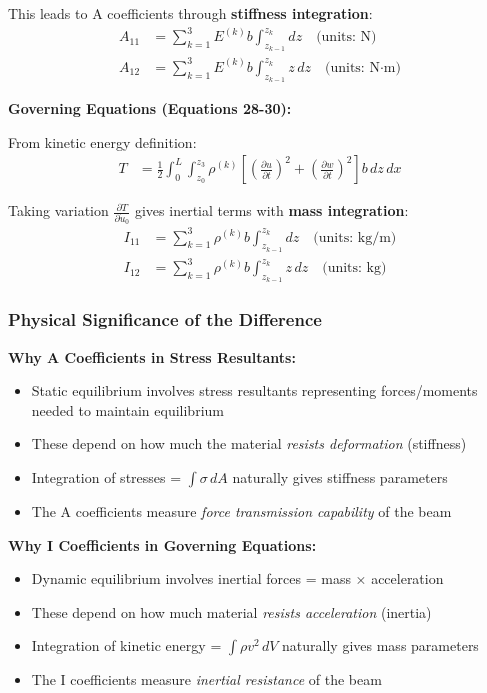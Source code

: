 \documentclass[12pt,a4paper]{article}
\begin{document}
This leads to A coefficients through \textbf{stiffness integration}:
\begin{align}
A_{11} &= \sum_{k=1}^{3} E^{(k)} b \int_{z_{k-1}}^{z_k} dz \quad \text{(units: N)} \\
A_{12} &= \sum_{k=1}^{3} E^{(k)} b \int_{z_{k-1}}^{z_k} z \, dz \quad \text{(units: N·m)}
\end{align}

\textbf{Governing Equations (Equations 28-30):}

From kinetic energy definition:
\begin{align}
T &= \frac{1}{2} \int_0^L \int_{z_0}^{z_3} \rho^{(k)}\left[\left(\frac{\partial u}{\partial t}\right)^2 + \left(\frac{\partial w}{\partial t}\right)^2\right] b \, dz \, dx
\end{align}

Taking variation $\frac{\partial T}{\partial \dot{u}_0}$ gives inertial terms with \textbf{mass integration}:
\begin{align}
I_{11} &= \sum_{k=1}^{3} \rho^{(k)} b \int_{z_{k-1}}^{z_k} dz \quad \text{(units: kg/m)} \\
I_{12} &= \sum_{k=1}^{3} \rho^{(k)} b \int_{z_{k-1}}^{z_k} z \, dz \quad \text{(units: kg)}
\end{align}

\subsubsection{Physical Significance of the Difference}

\textbf{Why A Coefficients in Stress Resultants:}
\begin{itemize}
\item Static equilibrium involves stress resultants representing forces/moments needed to maintain equilibrium
\item These depend on how much the material \textit{resists deformation} (stiffness)
\item Integration of stresses = $\int \sigma \, dA$ naturally gives stiffness parameters
\item The A coefficients measure \textit{force transmission capability} of the beam
\end{itemize}

\textbf{Why I Coefficients in Governing Equations:}
\begin{itemize}
\item Dynamic equilibrium involves inertial forces = mass × acceleration
\item These depend on how much material \textit{resists acceleration} (inertia)
\item Integration of kinetic energy = $\int \rho v^2 \, dV$ naturally gives mass parameters
\item The I coefficients measure \textit{inertial resistance} of the beam
\end{itemize}
\end{document}

